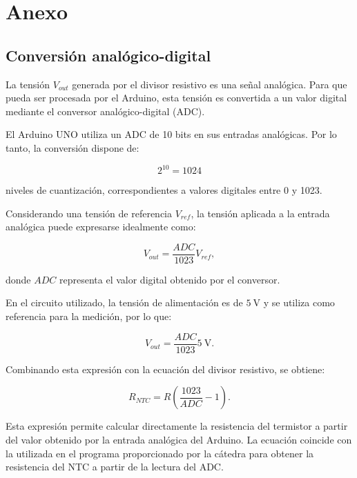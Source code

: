 \section{Anexo}

\subsection{Conversión analógico-digital}

La tensión $V_{out}$ generada por el divisor resistivo es una señal analógica. Para que pueda ser procesada por el Arduino, esta tensión es convertida a un valor digital mediante el conversor analógico-digital (ADC).

El Arduino UNO utiliza un ADC de 10 bits en sus entradas analógicas. Por lo tanto, la conversión dispone de:

\begin{equation}
2^{10}=1024
\end{equation}

niveles de cuantización, correspondientes a valores digitales entre 0 y 1023.

Considerando una tensión de referencia $V_{ref}$, la tensión aplicada a la entrada analógica puede expresarse idealmente como:

\begin{equation}
V_{out}
=
\frac{ADC}{1023}V_{ref},
\end{equation}

donde $ADC$ representa el valor digital obtenido por el conversor.

En el circuito utilizado, la tensión de alimentación es de $5~\mathrm{V}$ y se utiliza como referencia para la medición, por lo que:

\begin{equation}
V_{out}
=
\frac{ADC}{1023}5~\mathrm{V}.
\end{equation}

Combinando esta expresión con la ecuación del divisor resistivo, se obtiene:

\begin{equation}
R_{NTC}
=
R
\left(
\frac{1023}{ADC}-1
\right).
\end{equation}

Esta expresión permite calcular directamente la resistencia del termistor a partir del valor obtenido por la entrada analógica del Arduino. La ecuación coincide con la utilizada en el programa proporcionado por la cátedra para obtener la resistencia del NTC a partir de la lectura del ADC. 
